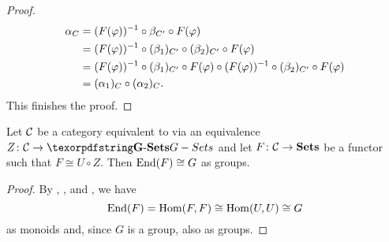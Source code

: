 \begin{proof}
\begin{align*}
\alpha_C &= (F(\varphi))^{-1} \circ \beta_{C'} \circ F(\varphi)\\
&= (F(\varphi))^{-1} \circ (\beta_1)_{C'} \circ (\beta_2)_{C'} \circ F(\varphi)\\
&= (F(\varphi))^{-1} \circ (\beta_1)_{C'} \circ F(\varphi) \circ (F(\varphi))^{-1} \circ (\beta_2)_{C'} \circ F(\varphi)\\
&= (\alpha_1)_C \circ (\alpha_2)_C.
\end{align*}
This finishes the proof.
\end{proof}

\begin{cor}
Let $\mathcal{C}$ be a category equivalent to \Gset{} via an equivalence $Z \colon \Ccal \to \Gset$ and let $F\colon \mathcal{C} \to {\ensuremath{{\operatorname{\mathbf{Sets}}}}}$ be a functor such that $F \cong U \circ Z$. Then $\operatorname{End}(F) \cong G$ as groups.
\end{cor}
\begin{proof}
By , , and , we have \[\operatorname{End}(F) = \operatorname{Hom}(F,F) \cong \operatorname{Hom}(U,U) \cong G\] as monoids and, since $G$ is a group, also as groups.
\end{proof}
